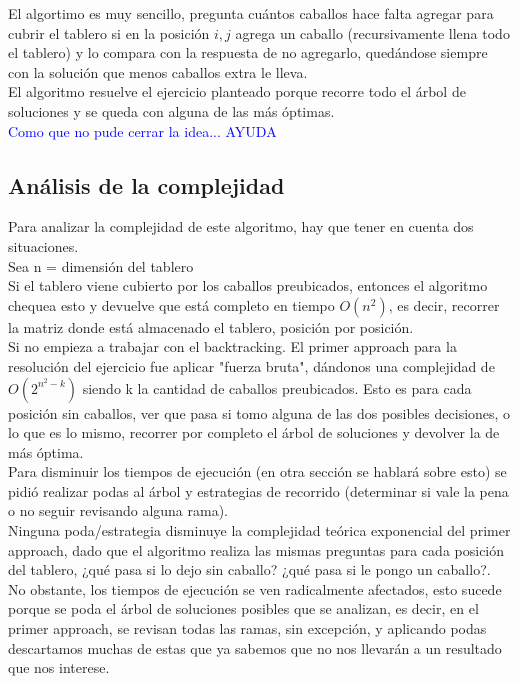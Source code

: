 El algortimo es muy sencillo, pregunta cu\'antos caballos hace falta agregar para cubrir el tablero si en la posici\'on $i, j$ agrega un caballo (recursivamente llena todo el tablero) y lo compara con la respuesta de no agregarlo, qued\'andose siempre con la soluci\'on que menos caballos extra le lleva.\\

El algoritmo resuelve el ejercicio planteado porque recorre todo el \'arbol de soluciones y se queda con alguna de las m\'as \'optimas.\\

\textcolor{blue}{Como que no pude cerrar la idea... AYUDA}

\newpage

\subsection{An\'alisis de la complejidad}
Para analizar la complejidad de este algoritmo, hay que tener en cuenta dos situaciones.\\

Sea n = dimensi\'on del tablero\\

Si el tablero viene cubierto por los caballos preubicados, entonces el algoritmo chequea esto y devuelve que est\'a completo en tiempo $O(n^{2})$, es decir, recorrer la matriz donde est\'a almacenado el tablero, posici\'on por posici\'on.\\

Si no empieza a trabajar con el backtracking. El primer approach para la resoluci\'on del ejercicio fue aplicar "fuerza bruta", d\'andonos una complejidad de $O(2^{n^{2} - k})$ siendo k la cantidad de caballos preubicados. Esto es para cada posici\'on sin caballos, ver que pasa si tomo alguna de las dos posibles decisiones, o lo que es lo mismo, recorrer por completo el \'arbol de soluciones y devolver la de m\'as \'optima.\\

Para disminuir los tiempos de ejecuci\'on (en otra secci\'on se hablar\'a sobre esto) se pidi\'o realizar podas al \'arbol y estrategias de recorrido (determinar si vale la pena o no seguir revisando alguna rama).\\

Ninguna poda/estrategia disminuye la complejidad te\'orica exponencial del primer approach, dado que el algoritmo realiza las mismas preguntas para cada posici\'on del tablero, ¿qu\'e pasa si lo dejo sin caballo? ¿qu\'e pasa si le pongo un caballo?. No obstante, los tiempos de ejecuci\'on se ven radicalmente afectados, esto sucede porque se poda el \'arbol de soluciones posibles que se analizan, es decir, en el primer approach, se revisan todas las ramas, sin excepci\'on, y aplicando podas descartamos muchas de estas que ya sabemos que no nos llevar\'an a un resultado que nos interese.\\


